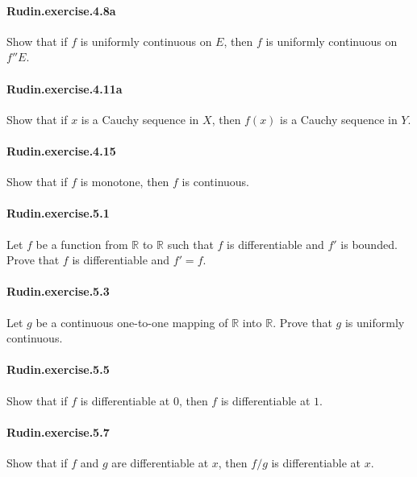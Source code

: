 \documentclass{article}
\begin{document}
\paragraph{Rudin.exercise.4.8a} Show that if $f$ is uniformly continuous on $E$, then $f$ is uniformly continuous on $f '' E$.

\paragraph{Rudin.exercise.4.11a} Show that if $x$ is a Cauchy sequence in $X$, then $f(x)$ is a Cauchy sequence in $Y$.

\paragraph{Rudin.exercise.4.15} Show that if $f$ is monotone, then $f$ is continuous.


\paragraph{Rudin.exercise.5.1} Let $f$ be a function from $\mathbb{R}$ to $\mathbb{R}$ such that $f$ is differentiable and $f'$ is bounded. Prove that $f$ is differentiable and $f' = f$.

\paragraph{Rudin.exercise.5.3} Let $g$ be a continuous one-to-one mapping of $\mathbb{R}$ into $\mathbb{R}$. Prove that $g$ is uniformly continuous.

\paragraph{Rudin.exercise.5.5} Show that if $f$ is differentiable at $0$, then $f$ is differentiable at $1$.

\paragraph{Rudin.exercise.5.7} Show that if $f$ and $g$ are differentiable at $x$, then $f/g$ is differentiable at $x$.
\end{document}
